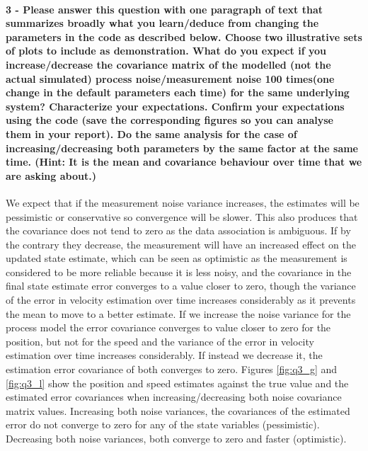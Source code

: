 \documentclass[12pt]{article}
\begin{document}
\paragraph{3 - Please answer this question with one paragraph of text that summarizes broadly what you learn/deduce from changing the parameters in the code as described below. Choose two illustrative sets of plots to include as demonstration. What do you expect if you increase/decrease the covariance matrix of the modelled (not the actual simulated) process noise/measurement noise 100 times(one change in the default parameters each time) for the same underlying system? Characterize your expectations. Confirm your expectations using the code (save the corresponding figures so you can analyse them in your report). Do the same analysis for the case of increasing/decreasing both parameters by the same factor at the same time. (Hint: It is the mean and covariance behaviour over time that we are asking about.)}
We expect that if the measurement noise variance increases, the estimates will be pessimistic or conservative so convergence will be slower. This also produces that the covariance does not tend to zero  as the data association is ambiguous. If by the contrary they decrease, the measurement will have an increased effect on the updated state estimate, which can be seen as optimistic as the measurement is considered to be more reliable because it is less noisy, and the covariance in the final state estimate error converges to a value closer to zero, though the variance of the error in velocity estimation over time increases considerably as it prevents the mean to move to a better estimate.
If we increase the noise variance for the process model the error covariance converges to value closer to zero for the position, but not for the speed and the variance of the error in velocity estimation over time increases considerably. If instead we decrease it, the estimation error covariance of both converges to zero. Figures \ref{fig:q3_g} and \ref{fig:q3_l} show the position and speed estimates against the true value and the estimated error covariances when increasing/decreasing both noise covariance matrix values.
Increasing both noise variances, the covariances of the estimated error do not converge to zero for any of the state variables (pessimistic). Decreasing both noise variances, both converge to zero and faster (optimistic).
\end{document}
